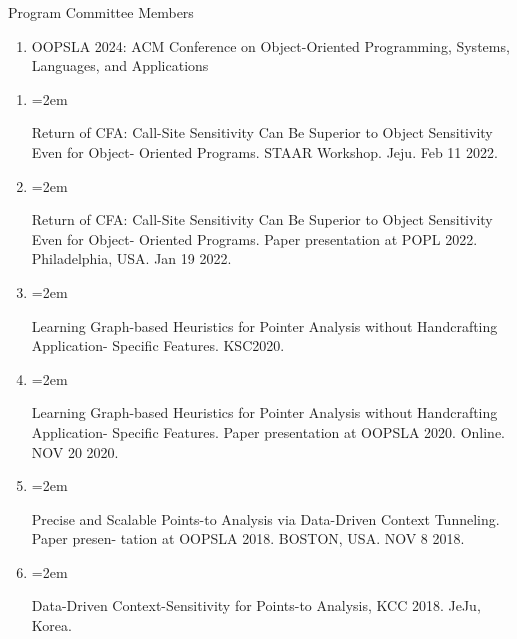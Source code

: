 \documentclass{scrartcl}
\newcommand{\Description}[1]{\hangindent=2em\hangafter=0\noindent\raggedright\footnotesize{#1}\par\normalsize\vspace{1em}} %
\begin{document}
\begin{cv}{}

\vspace{1em} %
\vspace{1em}

Program Committee Members

\begin{enumerate}
    \item OOPSLA 2024: ACM Conference on Object-Oriented Programming, Systems, Languages, and Applications
\end{enumerate}






\vspace{1em}

\begin{enumerate}

\item{\Description{Return of CFA: Call-Site Sensitivity Can Be Superior to Object Sensitivity Even for Object- Oriented Programs. STAAR Workshop. Jeju. Feb 11 2022.}}


\item{\Description{Return of CFA: Call-Site Sensitivity Can Be Superior to Object Sensitivity Even for Object- Oriented Programs. Paper presentation at POPL 2022. Philadelphia, USA. Jan 19 2022.}}

\item{\Description{Learning Graph-based Heuristics for Pointer Analysis without Handcrafting Application- Specific Features. KSC2020.}}

\item{\Description{Learning Graph-based Heuristics for Pointer Analysis without Handcrafting Application- Specific Features. Paper presentation at OOPSLA 2020. Online. NOV 20 2020.}}

\item{\Description{Precise and Scalable Points-to Analysis via Data-Driven Context Tunneling. Paper presen- tation at OOPSLA 2018. BOSTON, USA. NOV 8 2018.}}

\item{\Description{Data-Driven Context-Sensitivity for Points-to Analysis, KCC 2018. JeJu, Korea.}}


\end{enumerate}
\end{cv}
\end{document}
